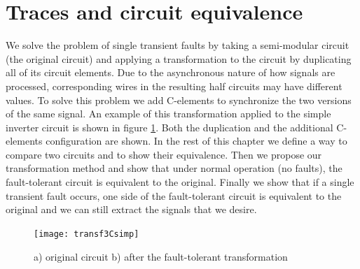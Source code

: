 \documentclass[12pt]{report}
\begin{document}
\section{Traces and circuit equivalence}
We solve the problem of single transient faults by taking a semi-modular circuit (the original circuit) and applying a transformation to the circuit by duplicating all of its circuit elements.  Due to the asynchronous nature of how signals are processed, corresponding wires in the resulting half circuits may have different values.  To solve this problem we add C-elements to synchronize the two versions of the same signal.   An example of this transformation applied to the simple inverter circuit is shown in figure \ref{fig:dupschemeex}.  Both the duplication and the additional C-elements configuration are shown.  In the rest of this chapter we define a way to compare two circuits and to show their equivalence.  Then we propose our transformation method and show that under normal operation (no faults), the fault-tolerant circuit is equivalent to the original.  Finally we show that if a single transient fault occurs, one side of the fault-tolerant circuit is equivalent to the original and we can still extract the signals that we desire.\\
\begin{figure}
  \centering
    \texttt{[image: transf3Csimp]}
  \caption{a) original circuit b) after the fault-tolerant transformation}
  \label{fig:dupschemeex}
\end{figure}
\end{document}
